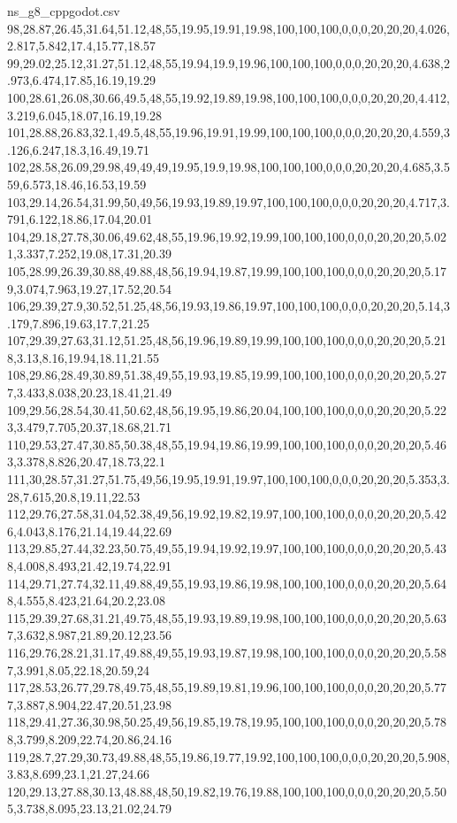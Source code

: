 \begin{filecontents*}[overwrite]{ns_g8_cppgodot.csv}
98,28.87,26.45,31.64,51.12,48,55,19.95,19.91,19.98,100,100,100,0,0,0,20,20,20,4.026,2.817,5.842,17.4,15.77,18.57
99,29.02,25.12,31.27,51.12,48,55,19.94,19.9,19.96,100,100,100,0,0,0,20,20,20,4.638,2.973,6.474,17.85,16.19,19.29
100,28.61,26.08,30.66,49.5,48,55,19.92,19.89,19.98,100,100,100,0,0,0,20,20,20,4.412,3.219,6.045,18.07,16.19,19.28
101,28.88,26.83,32.1,49.5,48,55,19.96,19.91,19.99,100,100,100,0,0,0,20,20,20,4.559,3.126,6.247,18.3,16.49,19.71
102,28.58,26.09,29.98,49,49,49,19.95,19.9,19.98,100,100,100,0,0,0,20,20,20,4.685,3.559,6.573,18.46,16.53,19.59
103,29.14,26.54,31.99,50,49,56,19.93,19.89,19.97,100,100,100,0,0,0,20,20,20,4.717,3.791,6.122,18.86,17.04,20.01
104,29.18,27.78,30.06,49.62,48,55,19.96,19.92,19.99,100,100,100,0,0,0,20,20,20,5.021,3.337,7.252,19.08,17.31,20.39
105,28.99,26.39,30.88,49.88,48,56,19.94,19.87,19.99,100,100,100,0,0,0,20,20,20,5.179,3.074,7.963,19.27,17.52,20.54
106,29.39,27.9,30.52,51.25,48,56,19.93,19.86,19.97,100,100,100,0,0,0,20,20,20,5.14,3.179,7.896,19.63,17.7,21.25
107,29.39,27.63,31.12,51.25,48,56,19.96,19.89,19.99,100,100,100,0,0,0,20,20,20,5.218,3.13,8.16,19.94,18.11,21.55
108,29.86,28.49,30.89,51.38,49,55,19.93,19.85,19.99,100,100,100,0,0,0,20,20,20,5.277,3.433,8.038,20.23,18.41,21.49
109,29.56,28.54,30.41,50.62,48,56,19.95,19.86,20.04,100,100,100,0,0,0,20,20,20,5.223,3.479,7.705,20.37,18.68,21.71
110,29.53,27.47,30.85,50.38,48,55,19.94,19.86,19.99,100,100,100,0,0,0,20,20,20,5.463,3.378,8.826,20.47,18.73,22.1
111,30,28.57,31.27,51.75,49,56,19.95,19.91,19.97,100,100,100,0,0,0,20,20,20,5.353,3.28,7.615,20.8,19.11,22.53
112,29.76,27.58,31.04,52.38,49,56,19.92,19.82,19.97,100,100,100,0,0,0,20,20,20,5.426,4.043,8.176,21.14,19.44,22.69
113,29.85,27.44,32.23,50.75,49,55,19.94,19.92,19.97,100,100,100,0,0,0,20,20,20,5.438,4.008,8.493,21.42,19.74,22.91
114,29.71,27.74,32.11,49.88,49,55,19.93,19.86,19.98,100,100,100,0,0,0,20,20,20,5.648,4.555,8.423,21.64,20.2,23.08
115,29.39,27.68,31.21,49.75,48,55,19.93,19.89,19.98,100,100,100,0,0,0,20,20,20,5.637,3.632,8.987,21.89,20.12,23.56
116,29.76,28.21,31.17,49.88,49,55,19.93,19.87,19.98,100,100,100,0,0,0,20,20,20,5.587,3.991,8.05,22.18,20.59,24
117,28.53,26.77,29.78,49.75,48,55,19.89,19.81,19.96,100,100,100,0,0,0,20,20,20,5.777,3.887,8.904,22.47,20.51,23.98
118,29.41,27.36,30.98,50.25,49,56,19.85,19.78,19.95,100,100,100,0,0,0,20,20,20,5.788,3.799,8.209,22.74,20.86,24.16
119,28.7,27.29,30.73,49.88,48,55,19.86,19.77,19.92,100,100,100,0,0,0,20,20,20,5.908,3.83,8.699,23.1,21.27,24.66
120,29.13,27.88,30.13,48.88,48,50,19.82,19.76,19.88,100,100,100,0,0,0,20,20,20,5.505,3.738,8.095,23.13,21.02,24.79

\end{filecontents*}
